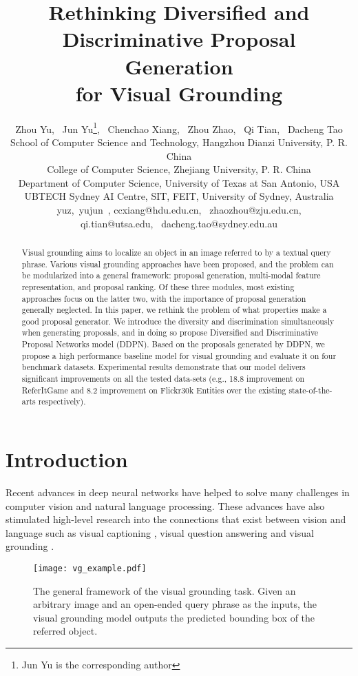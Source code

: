 \documentclass{article}
\title{Rethinking Diversified and Discriminative Proposal Generation\\ for Visual Grounding}
\author{
Zhou Yu,~
Jun Yu\thanks{Jun Yu is the corresponding author},~
Chenchao Xiang,~
Zhou Zhao,~
Qi Tian,~
Dacheng Tao
\\
 School of Computer Science and Technology, Hangzhou Dianzi University, P. R. China\\
 College of Computer Science, Zhejiang University, P. R. China\\
 Department of Computer Science, University of Texas at San Antonio, USA\\
 UBTECH Sydney AI Centre, SIT, FEIT, University of Sydney, Australia\\
yuz,~yujun~, ccxiang@hdu.edu.cn,~
zhaozhou@zju.edu.cn,\\
qi.tian@utsa.edu,~
dacheng.tao@sydney.edu.au
}
\begin{document}
\maketitle

\begin{abstract}
 Visual grounding aims to localize an object in an image referred to by a textual query phrase. Various visual grounding approaches have been proposed, and the problem can be modularized into a general framework: proposal generation, multi-modal feature representation, and proposal ranking. Of these three modules, most existing approaches focus on the latter two, with the importance of proposal generation generally neglected. In this paper, we rethink the problem of what properties make a good proposal generator. We introduce the diversity and discrimination simultaneously when generating proposals, and in doing so propose Diversified and Discriminative Proposal Networks model (DDPN). Based on the proposals generated by DDPN, we propose a high performance baseline model for visual grounding and evaluate it on four benchmark datasets. Experimental results demonstrate that our model delivers significant improvements on all the tested data-sets (e.g., 18.8 improvement on ReferItGame and 8.2 improvement on Flickr30k Entities over the existing state-of-the-arts respectively).
\end{abstract}

\section{Introduction}
Recent advances in deep neural networks have helped to solve many challenges in computer vision and natural language processing. These advances have also stimulated high-level research into the connections that exist between vision and language such as visual captioning \cite{donahue2015long,xu2015show}, visual question answering \cite{fukui2016multimodal,yu2017mfb,yu2018beyond} and visual grounding \cite{rohrbach2016grounding,chen2017query}.

\begin{figure}
\begin{center}
\texttt{[image: vg\_example.pdf]}
\vspace{-15pt}
\caption{The general framework of the visual grounding task. Given an arbitrary image and an open-ended query phrase as the inputs, the visual grounding model outputs the predicted bounding box of the referred object. }
\label{fig:vg_framework}
\end{center}
\vspace{-20pt}
\end{figure}
\end{document}
